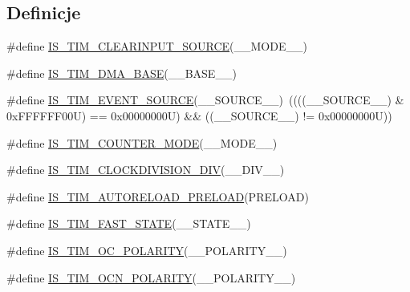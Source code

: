 \subsection*{Definicje}
\begin{DoxyCompactItemize}
\item 
\#define \hyperlink{group___t_i_m___private___macros_ga2bfb55166b01cec552638c1af05a5c54}{I\+S\+\_\+\+T\+I\+M\+\_\+\+C\+L\+E\+A\+R\+I\+N\+P\+U\+T\+\_\+\+S\+O\+U\+R\+CE}(\+\_\+\+\_\+\+M\+O\+D\+E\+\_\+\+\_\+)
\item 
\#define \hyperlink{group___t_i_m___private___macros_gaf79d218bcde86838a6371534dad4acdd}{I\+S\+\_\+\+T\+I\+M\+\_\+\+D\+M\+A\+\_\+\+B\+A\+SE}(\+\_\+\+\_\+\+B\+A\+S\+E\+\_\+\+\_\+)
\item 
\#define \hyperlink{group___t_i_m___private___macros_gae4a44eb3977f1cba86a9179c8c7f6b36}{I\+S\+\_\+\+T\+I\+M\+\_\+\+E\+V\+E\+N\+T\+\_\+\+S\+O\+U\+R\+CE}(\+\_\+\+\_\+\+S\+O\+U\+R\+C\+E\+\_\+\+\_\+)~((((\+\_\+\+\_\+\+S\+O\+U\+R\+C\+E\+\_\+\+\_\+) \& 0x\+F\+F\+F\+F\+F\+F00\+U) == 0x00000000\+U) \&\& ((\+\_\+\+\_\+\+S\+O\+U\+R\+C\+E\+\_\+\+\_\+) != 0x00000000\+U))
\item 
\#define \hyperlink{group___t_i_m___private___macros_ga51e09bf84a3abf86e47fa45047fd6506}{I\+S\+\_\+\+T\+I\+M\+\_\+\+C\+O\+U\+N\+T\+E\+R\+\_\+\+M\+O\+DE}(\+\_\+\+\_\+\+M\+O\+D\+E\+\_\+\+\_\+)
\item 
\#define \hyperlink{group___t_i_m___private___macros_gac7f7ba7f6f173631c81176d4602c2f11}{I\+S\+\_\+\+T\+I\+M\+\_\+\+C\+L\+O\+C\+K\+D\+I\+V\+I\+S\+I\+O\+N\+\_\+\+D\+IV}(\+\_\+\+\_\+\+D\+I\+V\+\_\+\+\_\+)
\item 
\#define \hyperlink{group___t_i_m___private___macros_gab99bb1fa5b82450c33c693d19c2893e7}{I\+S\+\_\+\+T\+I\+M\+\_\+\+A\+U\+T\+O\+R\+E\+L\+O\+A\+D\+\_\+\+P\+R\+E\+L\+O\+AD}(P\+R\+E\+L\+O\+AD)
\item 
\#define \hyperlink{group___t_i_m___private___macros_gaf65dbc2ef5f94e76d3a68bf71829760e}{I\+S\+\_\+\+T\+I\+M\+\_\+\+F\+A\+S\+T\+\_\+\+S\+T\+A\+TE}(\+\_\+\+\_\+\+S\+T\+A\+T\+E\+\_\+\+\_\+)
\item 
\#define \hyperlink{group___t_i_m___private___macros_gaff2871b7c01f0b706f90feb046995b95}{I\+S\+\_\+\+T\+I\+M\+\_\+\+O\+C\+\_\+\+P\+O\+L\+A\+R\+I\+TY}(\+\_\+\+\_\+\+P\+O\+L\+A\+R\+I\+T\+Y\+\_\+\+\_\+)
\item 
\#define \hyperlink{group___t_i_m___private___macros_gab196fb0e0bafa567b6888e72f0496a55}{I\+S\+\_\+\+T\+I\+M\+\_\+\+O\+C\+N\+\_\+\+P\+O\+L\+A\+R\+I\+TY}(\+\_\+\+\_\+\+P\+O\+L\+A\+R\+I\+T\+Y\+\_\+\+\_\+)
\item 

\end{DoxyCompactItemize}
